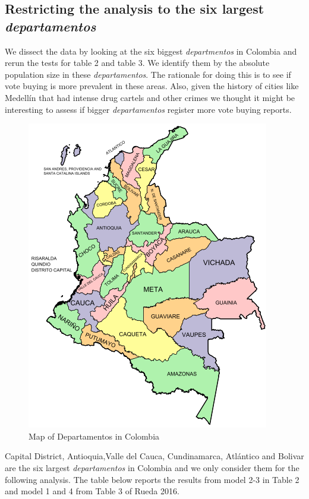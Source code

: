 \documentclass[12pt]{article}
\begin{document}
\subsection{Restricting the analysis to the six largest \textit{departamentos}}

We dissect the data by looking at the six biggest \textit{departmentos} in Colombia and rerun the tests for table 2 and table 3. We identify them by the absolute population size in these \textit{departamentos}. The rationale for doing this is to see if vote buying is more prevalent in these areas. Also, given the history of cities like Medellín that had intense drug cartels and other crimes we thought it might be interesting to assess if bigger \textit{departamentos} register more vote buying reports. 

\FloatBarrier
\begin{figure}[h!]
\includegraphics{departamentos.png}
\caption{Map of Departamentos in Colombia}
\end{figure}
\FloatBarrier

Capital District, Antioquia,Valle del Cauca, Cundinamarca, Atlántico and Bolivar are the six largest \textit{departamentos} in Colombia and we only consider them for the following analysis. The table below reports the results from model 2-3 in Table 2 and model 1 and 4 from Table 3 of Rueda 2016.
\end{document}
